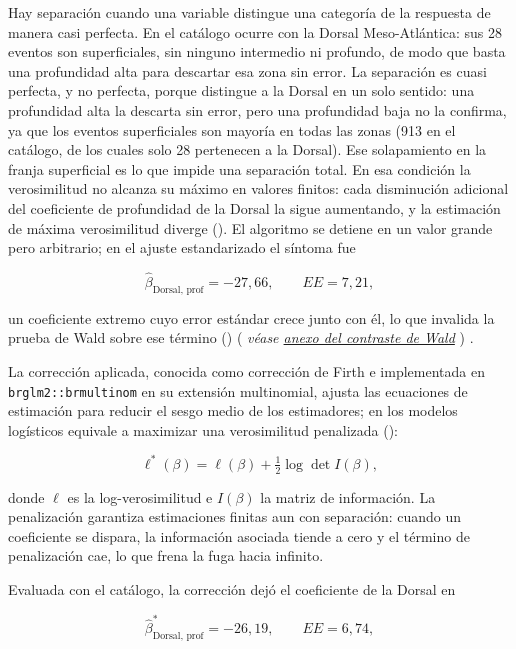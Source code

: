 \documentclass[
  spanish,
  letterpaper,
  DIV=11,
  numbers=noendperiod]{scrartcl}
\newcommand{\asesoriaParenRef}[1]{%
  \textnormal{\textcolor{asesoriaTextColor}{(}}%
  {\hypersetup{linkcolor=asesoriaLinkColor,urlcolor=asesoriaLinkColor,citecolor=asesoriaLinkColor}\textcolor{asesoriaTextColor}{\emph{#1}}}%
  \textnormal{\textcolor{asesoriaTextColor}{)}}%
}
\begin{document}
Hay separación cuando una variable distingue una categoría de la
respuesta de manera casi perfecta. En el catálogo ocurre con la Dorsal
Meso-Atlántica: sus 28 eventos son superficiales, sin ninguno intermedio
ni profundo, de modo que basta una profundidad alta para descartar esa
zona sin error. La separación es cuasi perfecta, y no perfecta, porque
distingue a la Dorsal en un solo sentido: una profundidad alta la
descarta sin error, pero una profundidad baja no la confirma, ya que los
eventos superficiales son mayoría en todas las zonas (913 en el
catálogo, de los cuales solo 28 pertenecen a la Dorsal). Ese
solapamiento en la franja superficial es lo que impide una separación
total. En esa condición la verosimilitud no alcanza su máximo en valores
finitos: cada disminución adicional del coeficiente de profundidad de la
Dorsal la sigue aumentando, y la estimación de máxima verosimilitud
diverge ().
El algoritmo se detiene en un valor grande pero arbitrario; en el ajuste
estandarizado el síntoma fue

\[
\hat\beta_{\text{Dorsal, prof}}=-27{,}66,
\qquad
EE=7{,}21,
\]

un coeficiente extremo cuyo error estándar crece junto con él, lo que
invalida la prueba de Wald sobre ese término
()
\asesoriaParenRef{véase \hyperref[sec-anexo-wald]{anexo del contraste de Wald}}.

La corrección aplicada, conocida como corrección de Firth e implementada
en \texttt{brglm2::brmultinom} en su extensión multinomial, ajusta las
ecuaciones de estimación para reducir el sesgo medio de los estimadores;
en los modelos logísticos equivale a maximizar una verosimilitud
penalizada ():

\[
\ell^{*}(\beta)=\ell(\beta)+\tfrac{1}{2}\log\det I(\beta),
\]

donde \(\ell\) es la log-verosimilitud e \(I(\beta)\) la matriz de
información. La penalización garantiza estimaciones finitas aun con
separación: cuando un coeficiente se dispara, la información asociada
tiende a cero y el término de penalización cae, lo que frena la fuga
hacia infinito.

Evaluada con el catálogo, la corrección dejó el coeficiente de la Dorsal
en

\[
\hat\beta^{*}_{\text{Dorsal, prof}}=-26{,}19,
\qquad
EE=6{,}74,
\]
\end{document}
